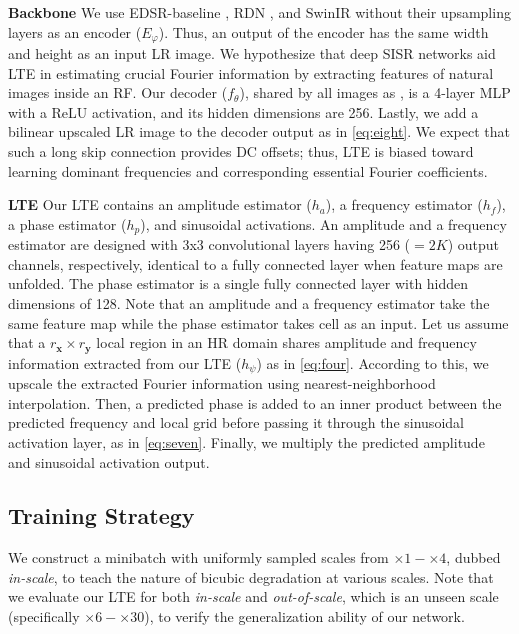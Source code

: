 \documentclass[10pt,twocolumn,letterpaper]{article}
\begin{document}
\textbf{Backbone} We use EDSR-baseline \cite{Lim_2017_CVPR_Workshops}, RDN \cite{zhang2018residual}, and SwinIR \cite{liang2021swinir} without their upsampling layers as an encoder ($E_\varphi$). Thus, an output of the encoder has the same width and height as an input LR image. We hypothesize that deep SISR networks \cite{Lim_2017_CVPR_Workshops, zhang2018residual, liang2021swinir} aid LTE in estimating crucial Fourier information by extracting features of natural images inside an RF. Our decoder ($f_\theta$), shared by all images as \cite{chen2021learning}, is a 4-layer MLP with a ReLU activation, and its hidden dimensions are 256. Lastly, we add a bilinear upscaled LR image to the decoder output as in \cref{eq:eight}. We expect that such a long skip connection provides DC offsets; thus, LTE is biased toward learning dominant frequencies and corresponding essential Fourier coefficients.

\textbf{LTE} Our LTE contains an amplitude estimator ($h_a$), a frequency estimator ($h_f$), a phase estimator ($h_p$), and sinusoidal activations. An amplitude and a frequency estimator are designed with 3x3 convolutional layers having 256 ($=2K$) output channels, respectively, identical to a fully connected layer when feature maps are unfolded. The phase estimator is a single fully connected layer with hidden dimensions of 128. Note that an amplitude and a frequency estimator take the same feature map while the phase estimator takes cell as an input. Let us assume that a $r_{\mathbf x}\times r_{\mathbf y}$ local region in an HR domain shares amplitude and frequency information extracted from our LTE ($h_\psi$) as in \cref{eq:four}. According to this, we upscale the extracted Fourier information using nearest-neighborhood interpolation. Then, a predicted phase is added to an inner product between the predicted frequency and local grid before passing it through the sinusoidal activation layer, as in \cref{eq:seven}. Finally, we multiply the predicted amplitude and sinusoidal activation output.



\subsection{Training Strategy}
We construct a minibatch with uniformly sampled scales from $\times1-\times4$, dubbed \textit{in-scale}, to teach the nature of bicubic degradation at various scales. Note that we evaluate our LTE for both \textit{in-scale} and \textit{out-of-scale}, which is an unseen scale (specifically $\times6-\times30$), to verify the generalization ability of our network.
\end{document}
